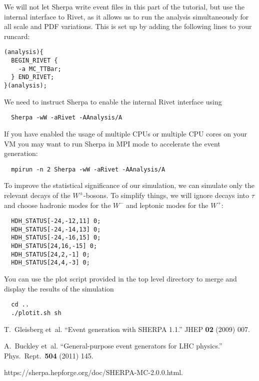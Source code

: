 \documentclass[10pt]{article}
\begin{document}
We will not let Sherpa write event files in this part of the tutorial,
but use the internal interface to Rivet, as it allows us to run the analysis
simultaneously for all scale and PDF variations. This is set up by adding
the following lines to your runcard:
\begin{verbatim}
(analysis){
  BEGIN_RIVET {
    -a MC_TTBar;
  } END_RIVET;
}(analysis);
\end{verbatim}
We need to instruct Sherpa to enable the internal Rivet interface using
\begin{verbatim}
  Sherpa -wW -aRivet -AAnalysis/A
\end{verbatim}
If you have enabled the usage of multiple CPUs or multiple CPU cores on your VM
you may want to run Sherpa in MPI mode to accelerate the event generation:
\begin{verbatim}
  mpirun -n 2 Sherpa -wW -aRivet -AAnalysis/A
\end{verbatim}
To improve the statistical significance of our simulation, we can simulate
only the relevant decays of the $W^\pm$-bosons. To simplify things, we will
ignore decays into $\tau$ and choose hadronic modes for the $W^-$ and 
leptonic modes for the $W^+$:
\begin{verbatim}
  HDH_STATUS[-24,-12,11] 0;
  HDH_STATUS[-24,-14,13] 0;
  HDH_STATUS[-24,-16,15] 0;
  HDH_STATUS[24,16,-15] 0;
  HDH_STATUS[24,2,-1] 0;
  HDH_STATUS[24,4,-3] 0;
\end{verbatim}
You can use the plot script provided in the top level directory to merge and
display the results of the simulation
\begin{verbatim}
  cd ..
  ./plotit.sh sh
\end{verbatim}

\begin{thebibliography}{1}

T.~Gleisberg et~al.
``Event generation with SHERPA 1.1.''
JHEP {\bf 02} (2009) 007.

A.~Buckley et~al.
``General-purpose event generators for LHC physics.''
Phys.\ Rept.\ {\bf 504} (2011) 145.

https://sherpa.hepforge.org/doc/SHERPA-MC-2.0.0.html.

\end{thebibliography}
\end{document}
